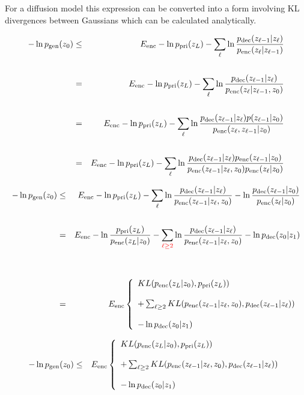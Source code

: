 {\vfill
For a diffusion model this expression can be converted into a form involving KL divergences between Gaussians which can be calculated analytically.


{\huge
\begin{eqnarray*}
- \ln p_{\mathrm{gen}}(z_0) & \leq & E_{\mathrm{enc}} -\ln p_{\mathrm{pri}}(z_L) - \sum_{\ell } \ln \frac{p_{\mathrm{dec}}(z_{\ell-1}|z_\ell)}{p_{\mathrm{enc}}(z_\ell|z_{\ell-1})} \\
\\
& = & E_{\mathrm{enc}} -\ln p_{\mathrm{pri}}(z_L) - \sum_{\ell } \ln \frac{p_{\mathrm{dec}}(z_{\ell-1}|z_\ell)}{p_{\mathrm{enc}}(z_\ell|z_{\ell-1},z_0)} \\
\\
& = & E_{\mathrm{enc}} -\ln p_{\mathrm{pri}}(z_L) - \sum_{\ell } \ln \frac{p_{\mathrm{dec}}(z_{\ell-1}|z_\ell)p(z_{\ell-1}|z_0)}{p_{\mathrm{enc}}(z_\ell,z_{\ell-1}|z_0)} \\
\\
& = & E_{\mathrm{enc}} -\ln p_{\mathrm{pri}}(z_L) - \sum_{\ell } \ln \frac{p_{\mathrm{dec}}(z_{\ell-1}|z_\ell)p_{\mathrm{enc}}(z_{\ell-1}|z_0)}{p_{\mathrm{enc}}(z_{\ell-1}|z_\ell,z_0)p_{\mathrm{enc}}(z_\ell|z_0)}
\end{eqnarray*}
}



{\huge
\begin{eqnarray*}
- \ln p_{\mathrm{gen}}(z_0) & \leq & E_{\mathrm{enc}} -\ln p_{\mathrm{pri}}(z_L) - \sum_{\ell } \ln \frac{p_{\mathrm{dec}}(z_{\ell-1}|z_\ell)}{p_{\mathrm{enc}}(z_{\ell-1}|z_\ell,z_0)}
- \ln \frac{p_{\mathrm{dec}}(z_{\ell-1}|z_0)}{p_{\mathrm{enc}}(z_\ell|z_0)} \\
\\
& = & E_{\mathrm{enc}} -\ln \frac{p_{\mathrm{pri}}(z_L)}{p_{\mathrm{enc}}(z_L|z_0)} - \sum_{\color{red} \ell \geq 2} \ln \frac{p_{\mathrm{dec}}(z_{\ell-1}|z_\ell)}{p_{\mathrm{enc}}(z_{\ell-1}|z_\ell,z_0)} - \ln p_{\mathrm{dec}}(z_0|z_1) \\
\\
\\
& = & E_{\mathrm{enc}} \left\{\begin{array}{l}KL(p_{\mathrm{enc}}(z_L|z_0),p_{\mathrm{pri}}(z_L)) \\
\\
+ \sum_{\ell \geq 2} KL(p_{\mathrm{enc}}(z_{\ell-1}|z_\ell,z_0),p_{\mathrm{dec}}(z_{\ell-1}|z_\ell)) \\
\\
- \ln p_{\mathrm{dec}}(z_0|z_1) \end{array} \right.
\end{eqnarray*}
}



{\huge
  \begin{eqnarray*}
    - \ln p_{\mathrm{gen}}(z_0) & \leq & E_{\mathrm{enc}} \left\{\begin{array}{l}KL(p_{\mathrm{enc}}(z_L|z_0),p_{\mathrm{pri}}(z_L)) \\
\\
+ \sum_{\ell \geq 2} KL(p_{\mathrm{enc}}(z_{\ell-1}|z_\ell,z_0),p_{\mathrm{dec}}(z_{\ell-1}|z_\ell)) \\
\\
- \ln p_{\mathrm{dec}}(z_0|z_1) \end{array} \right.
\end{eqnarray*}
}

}
